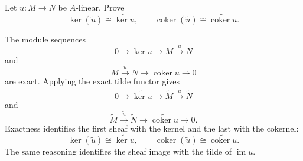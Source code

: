 \begin{problem}\label{prob:vi33-14}
Let \(u:M\to N\) be \(A\)-linear. Prove
\[
\ker(\widetilde u)\cong\widetilde{\ker u},
\qquad
\operatorname{coker}(\widetilde u)\cong\widetilde{\operatorname{coker}u}.
\]

\end{problem}

\ifdefined\FullProblemDossiers
\begin{solution}
The module sequences
\[
0\to\ker u\to M\xrightarrow{u}N
\]
and
\[
M\xrightarrow{u}N\to\operatorname{coker}u\to0
\]
are exact. Applying the exact tilde functor gives
\[
0\to\widetilde{\ker u}
\to\widetilde M
\xrightarrow{\widetilde u}
\widetilde N
\]
and
\[
\widetilde M
\xrightarrow{\widetilde u}
\widetilde N
\to
\widetilde{\operatorname{coker}u}
\to0.
\]
Exactness identifies the first sheaf with the kernel and the last with the cokernel:
\[
\boxed{
\ker(\widetilde u)\cong\widetilde{\ker u},
\qquad
\operatorname{coker}(\widetilde u)\cong\widetilde{\operatorname{coker}u}.
}
\]
The same reasoning identifies the sheaf image with the tilde of \(\operatorname{im}u\).
\end{solution}
\fi
